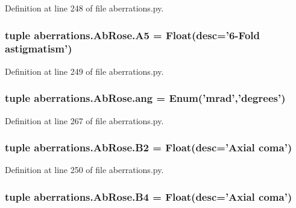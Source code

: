 Definition at line 248 of file aberrations.\-py.

\hypertarget{classaberrations_1_1_ab_rose_a2dfc8dd5fb7d2f8efb0ec57279872043}{
\subsubsection[{A5}]{\setlength{\rightskip}{0pt plus 5cm}tuple aberrations.\-Ab\-Rose.\-A5 = Float(desc='6-\/Fold astigmatism')\hspace{0.3cm}{\ttfamily [static]}}}\label{classaberrations_1_1_ab_rose_a2dfc8dd5fb7d2f8efb0ec57279872043}


Definition at line 249 of file aberrations.\-py.

\hypertarget{classaberrations_1_1_ab_rose_a2c76b8c7855151743a4ee2e2755c300e}{
\subsubsection[{ang}]{\setlength{\rightskip}{0pt plus 5cm}tuple aberrations.\-Ab\-Rose.\-ang = Enum('mrad','degrees')\hspace{0.3cm}{\ttfamily [static]}}}\label{classaberrations_1_1_ab_rose_a2c76b8c7855151743a4ee2e2755c300e}


Definition at line 267 of file aberrations.\-py.

\hypertarget{classaberrations_1_1_ab_rose_a881a1c8d7995ba69d8bd9866678801a3}{
\subsubsection[{B2}]{\setlength{\rightskip}{0pt plus 5cm}tuple aberrations.\-Ab\-Rose.\-B2 = Float(desc='Axial coma')\hspace{0.3cm}{\ttfamily [static]}}}\label{classaberrations_1_1_ab_rose_a881a1c8d7995ba69d8bd9866678801a3}


Definition at line 250 of file aberrations.\-py.

\hypertarget{classaberrations_1_1_ab_rose_a00195b5a8abf40ac8636171c7c6c6704}{
\subsubsection[{B4}]{\setlength{\rightskip}{0pt plus 5cm}tuple aberrations.\-Ab\-Rose.\-B4 = Float(desc='Axial coma')\hspace{0.3cm}{\ttfamily [static]}}}\label{classaberrations_1_1_ab_rose_a00195b5a8abf40ac8636171c7c6c6704}


